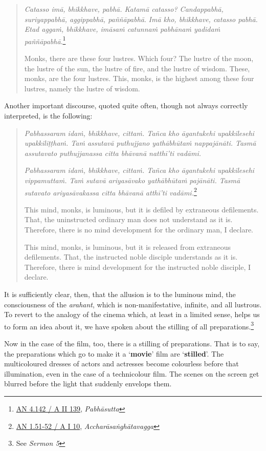 \begin{quote}
\emph{Catasso imā, bhikkhave, pabhā. Katamā catasso? Candappabhā, suriyappabhā, aggippabhā, paññāpabhā}. \emph{Imā kho, bhikkhave, catasso pabhā. Etad aggaṁ, bhikkhave, imāsaṁ catunnaṁ pabhānaṁ yadidaṁ paññāpabhā}.\footnote{\href{https://suttacentral.net/an4.142/pli/ms}{AN 4.142 / A II 139}, \emph{Pabhāsutta}}

Monks, there are these four lustres. Which four? The lustre of the moon, the lustre of the sun, the lustre of fire, and the lustre of wisdom. These, monks, are the four lustres. This, monks, is the highest among these four lustres, namely the lustre of wisdom.
\end{quote}

Another important discourse, quoted quite often, though not always correctly interpreted, is the following:

\begin{quote}
\emph{Pabhassaram idaṁ, bhikkhave, cittaṁ. Tañca kho āgantukehi upakkilesehi upakkiliṭṭhaṁ. Taṁ assutavā puthujjano yathābhūtaṁ nappajānāti. Tasmā assutavato puthujjanassa citta bhāvanā natthī'ti vadāmi.}

\emph{Pabhassaram idaṁ, bhikkhave, cittaṁ. Tañca kho āgantukehi upakkilesehi vippamuttaṁ. Taṁ sutavā ariyasāvako yathābhūtaṁ pajānāti. Tasmā sutavato ariyasāvakassa citta bhāvanā atthī'ti vadāmi.}\footnote{\href{https://suttacentral.net/an1.51-60/pli/ms}{AN 1.51-52 / A I 10}, \emph{Accharāsaṅghātavagga}}

This mind, monks, is luminous, but it is defiled by extraneous defilements. That, the uninstructed ordinary man does not understand as it is. Therefore, there is no mind development for the ordinary man, I declare.

This mind, monks, is luminous, but it is released from extraneous defilements. That, the instructed noble disciple understands as it is. Therefore, there is mind development for the instructed noble disciple, I declare.
\end{quote}

It is sufficiently clear, then, that the allusion is to the luminous mind, the consciousness of the \emph{arahant}, which is non-manifestative, infinite, and all lustrous. To revert to the analogy of the cinema which, at least in a limited sense, helps us to form an idea about it, we have spoken about the stilling of all preparations.\footnote{See \emph{Sermon 5}}

Now in the case of the film, too, there is a stilling of preparations. That is to say, the preparations which go to make it a `\textbf{movie}' film are `\textbf{stilled}'. The multicoloured dresses of actors and actresses become colourless before that illumination, even in the case of a technicolour film. The scenes on the screen get blurred before the light that suddenly envelops them.

